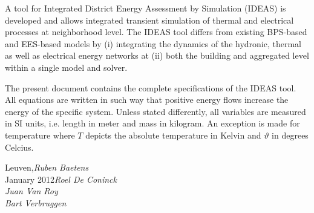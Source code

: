 %
%

\preface

A tool for Integrated District Energy Assessment by Simulation (IDEAS) is developed
and allows integrated transient simulation of thermal and electrical processes at neighborhood
level. The IDEAS tool differs from existing BPS-based and EES-based models by (i) integrating the dynamics of the hydronic, thermal as well as electrical energy networks at (ii)
both the building and aggregated level within a single model and solver.

The present document contains the complete specifications of the IDEAS tool. All equations are written in such way that positive energy flows increase the energy of the specific system. Unless stated differently, all variables are measured in SI units, i.e. length in meter and mass in kilogram. An exception is made for temperature where $T$ depicts the absolute temperature in Kelvin and $\vartheta$ in degrees Celcius.
 
\vspace{\baselineskip}
\begin{flushright}\noindent
Leuven,\hfill {\it Ruben Baetens}\\
January 2012\hfill {\it Roel De Coninck}\\
 \hfill {\it Juan Van Roy}\\
 \hfill {\it Bart Verbruggen}\\
\end{flushright}


